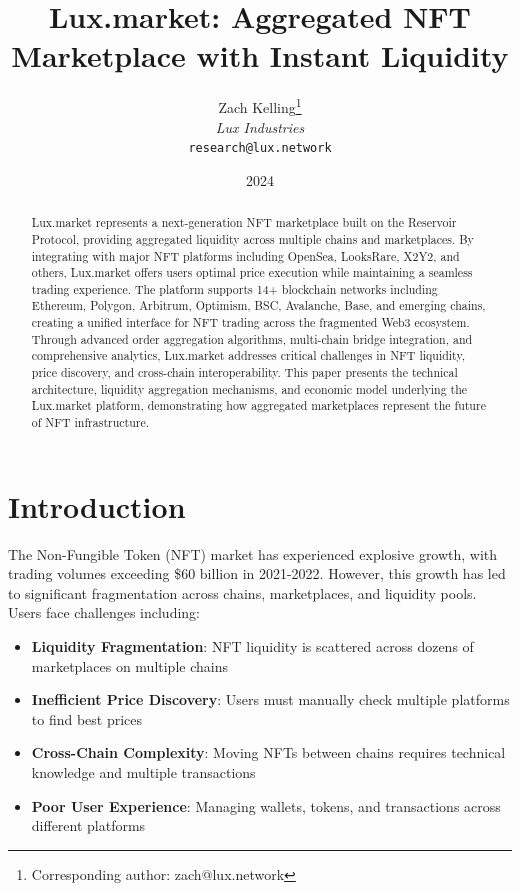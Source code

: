 \documentclass[11pt,a4paper]{article}
\title{Lux.market: Aggregated NFT Marketplace with Instant Liquidity}
\author{
Zach Kelling\thanks{Corresponding author: zach@lux.network}\\
\textit{Lux Industries}\\
\texttt{research@lux.network}
}
\date{2024}
\begin{document}
\luxcoverpage
\maketitle

\begin{abstract}
Lux.market represents a next-generation NFT marketplace built on the Reservoir Protocol, providing aggregated liquidity across multiple chains and marketplaces. By integrating with major NFT platforms including OpenSea, LooksRare, X2Y2, and others, Lux.market offers users optimal price execution while maintaining a seamless trading experience. The platform supports 14+ blockchain networks including Ethereum, Polygon, Arbitrum, Optimism, BSC, Avalanche, Base, and emerging chains, creating a unified interface for NFT trading across the fragmented Web3 ecosystem. Through advanced order aggregation algorithms, multi-chain bridge integration, and comprehensive analytics, Lux.market addresses critical challenges in NFT liquidity, price discovery, and cross-chain interoperability. This paper presents the technical architecture, liquidity aggregation mechanisms, and economic model underlying the Lux.market platform, demonstrating how aggregated marketplaces represent the future of NFT infrastructure.
\end{abstract}

\section{Introduction}

The Non-Fungible Token (NFT) market has experienced explosive growth, with trading volumes exceeding \$60 billion in 2021-2022. However, this growth has led to significant fragmentation across chains, marketplaces, and liquidity pools. Users face challenges including:

\begin{itemize}
\item \textbf{Liquidity Fragmentation}: NFT liquidity is scattered across dozens of marketplaces on multiple chains
\item \textbf{Inefficient Price Discovery}: Users must manually check multiple platforms to find best prices
\item \textbf{Cross-Chain Complexity}: Moving NFTs between chains requires technical knowledge and multiple transactions
\item \textbf{Poor User Experience}: Managing wallets, tokens, and transactions across different platforms
\end{itemize}
\end{document}
